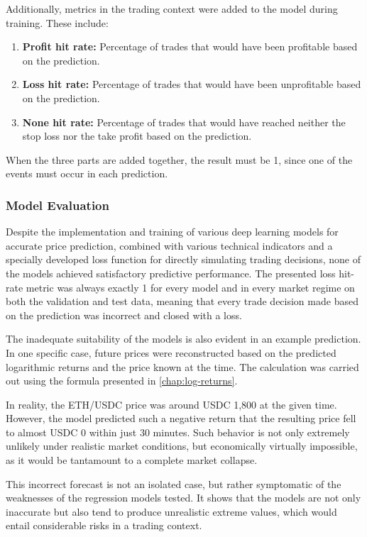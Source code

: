 Additionally, metrics in the trading context were added to the model during training.
These include:

\begin{enumerate}
    \item \textbf{Profit hit rate:} Percentage of trades that would have been profitable based on the prediction.
    \item \textbf{Loss hit rate:} Percentage of trades that would have been unprofitable based on the prediction.
    \item \textbf{None hit rate:} Percentage of trades that would have reached neither the stop loss nor the take profit based on the prediction.
\end{enumerate}

\noindent
When the three parts are added together, the result must be 1, since one of the events must occur in each prediction.

\subsubsection{Model Evaluation}
\label{chap:regression-models-evaluation}

Despite the implementation and training of various deep learning models for accurate price prediction, combined with various technical indicators and a specially developed loss function for directly simulating trading decisions, none of the models achieved satisfactory predictive performance.
The presented loss hit-rate metric was always exactly 1 for every model and in every market regime on both the validation and test data, meaning that every trade decision made based on the prediction was incorrect and closed with a loss.

The inadequate suitability of the models is also evident in an example prediction.
In one specific case, future prices were reconstructed based on the predicted logarithmic returns and the price known at the time.
The calculation was carried out using the formula presented in \autoref{chap:log-returns}.

In reality, the ETH/USDC price was around USDC 1,800 at the given time.
However, the model predicted such a negative return that the resulting price fell to almost USDC 0 within just 30 minutes.
Such behavior is not only extremely unlikely under realistic market conditions, but economically virtually impossible, as it would be tantamount to a complete market collapse.

This incorrect forecast is not an isolated case, but rather symptomatic of the weaknesses of the regression models tested.
It shows that the models are not only inaccurate but also tend to produce unrealistic extreme values, which would entail considerable risks in a trading context.

